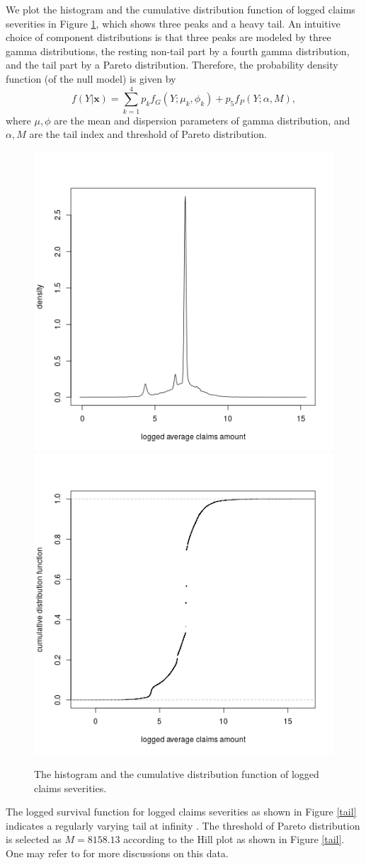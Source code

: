 \documentclass[11pt]{article}
\numberwithin{equation}{section}
\def\bx{\boldsymbol{x}}
\begin{document}
We plot the histogram and the cumulative distribution function of logged claims severities in Figure \ref{hist}, which shows three peaks and a heavy tail. 
An intuitive choice of component distributions is that 
three peaks are modeled by three gamma distributions, the resting non-tail part by a fourth gamma distribution, and the tail part by a Pareto distribution.
Therefore, the probability density function (of the null model) is given by
\begin{equation}\label{sev-0}
	f(Y|\bx)=\sum_{k=1}^4p_kf_{G}(Y;\mu_k,\phi_k)+p_5f_{P}(Y;\alpha,M),
\end{equation}
	where $\mu,\phi$ are the mean and dispersion parameters of gamma distribution, and $\alpha, M$ are the tail index and threshold of Pareto distribution. 
\begin{figure}[h!]
	\centering
	\includegraphics[width=0.4\linewidth]{../plots/sev/hist.png}
	\includegraphics[width=0.4\linewidth]{../plots/sev/cdf.png}
	\caption{The histogram and the cumulative distribution function of logged claims severities.}\label{hist}
\end{figure}

	The logged survival function for logged claims severities as shown in Figure \ref{tail} indicates a regularly varying  tail at infinity \citep{embrechts2013modelling}.
	The threshold of Pareto distribution is selected as $M=8158.13$ according to the Hill plot \citep{resnick1997heavy} as shown in Figure \ref{tail}. One may refer to \citet{wuthrich2022statistical} for more discussions on this data.
	
\end{document}
